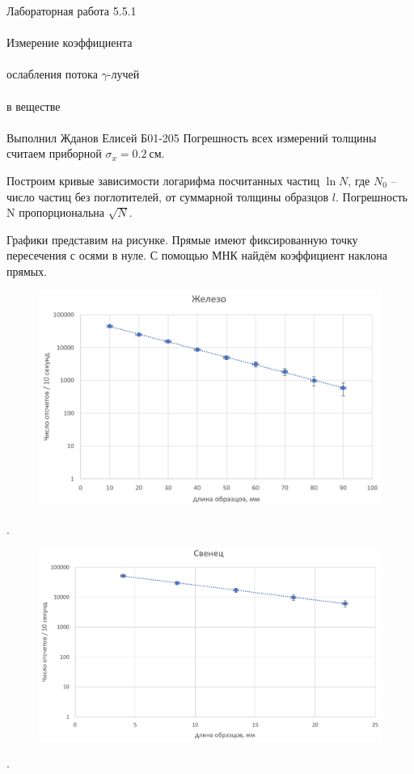 \documentclass{astroedu-lab}
\begin{document}
\begin{problem}{\huge Лабораторная работа 5.5.1\\\\Измерение коэффициента\\\\ослабления потока $\gamma$-лучей\\\\в веществе\\\\Выполнил Жданов Елисей Б01-205}
Погрешность всех измерений толщины считаем приборной $\sigma_x = 0.2~\text{см}$.

Построим кривые зависимости логарифма посчитанных частиц $\ln N$, где $N_0$ -- число частиц без поглотителей, от суммарной толщины образцов $l$.
Погрешность N пропорциональна $\sqrt N$.

Графики представим на рисунке. Прямые имеют фиксированную точку пересечения с осями в нуле. С помощью МНК найдём коэффициент наклона прямых.

\begin{figure}[h]
\includegraphics[scale=0.23]{10.png}
\centering
\end{figure}

.

\begin{figure}[h]
\includegraphics[scale=0.23]{20.png}
\centering
\end{figure}

.


\end{problem}
\end{document}
